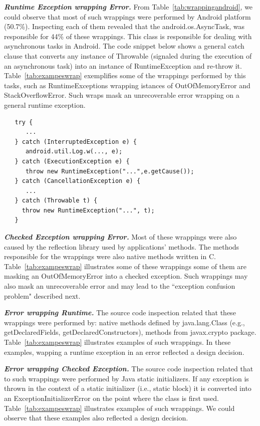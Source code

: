 \documentclass[conference]{IEEEtran}
\begin{document}
\emph{\textbf{Runtime Exception wrapping Error.}} From Table~\ref{tab:wrappingandroid}, we could observe that most of such wrappings
were performed by Android platform (50.7\%). Inspecting each of them revealed that the android.os.AsyncTask, was responsible for 44\% 
of these wrappings. This class is responsible for dealing with asynchronous tasks in Android.
The code snippet below shows a general catch clause that converts any instance of Throwable (signaled during the execution
of an asynchronous task) into an instance of RuntimeException and re-throw it.  
Table~\ref{tab:exampeswrap} exemplifies some of the wrappings performed by this tasks, such as 
RuntimeExceptions wrapping istances of OutOfMemoryError and StackOverflowError. 
Such wraps mask an unrecoverable error wrapping on a general runtime exception.

{\footnotesize
\begin{verbatim}
   try {
      ...
   } catch (InterruptedException e) {
      android.util.Log.w(..., e);
   } catch (ExecutionException e) {
      throw new RuntimeException("...",e.getCause());
   } catch (CancellationException e) {
      ...
   } catch (Throwable t) {
     throw new RuntimeException("...", t);
   }
\end{verbatim}
}

\emph{\textbf{Checked Exception wrapping Error.}} Most of these wrappings
 were also caused by the reflection library used by applications' methods. The methods responsible for the wrappings
were also native methods written in C. Table~\ref{tab:exampeswrap} illustrates
some of these wrappings some of them are masking an OutOfMemoryError
into a checked exception. Such wrappings may also mask an unrecoverable error
and may lead to the ``exception confusion problem" described next.

\emph{\textbf{Error wrapping Runtime.}} The source code inspection related that
these wrappings were performed by: native methods defined by 
java.lang.Class (e.g., getDeclaredFields, getDeclaredConstructors), 
methods from javax.crypto package. Table~\ref{tab:exampeswrap}  illustrates
examples of such wrappings. In these examples, wapping a runtime exception in an error
reflected a design decision.

\emph{\textbf{Error wrapping Checked Exception.}} 
The source code inspection related that to such wrappings were 
performed by Java static initializers. If any exception is thrown in the context of a static initializer 
(i.e., static block)  it is converted into an ExceptionInitializerError 
on the point where the class is first used.  Table~\ref{tab:exampeswrap} illustrates
examples of such wrappings. We could observe that these examples also reflected
a design decision.
\end{document}
